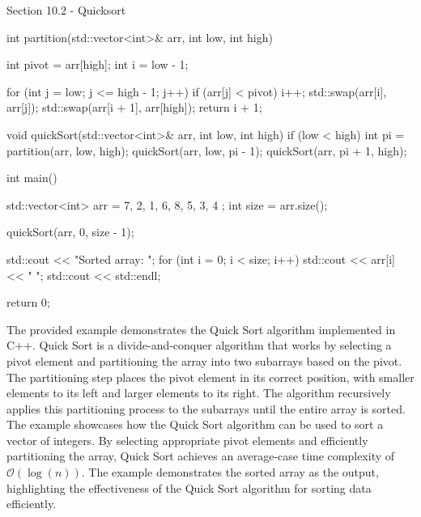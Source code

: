 \begin{notes}{Section 10.2 - Quicksort}
\begin{highlight}
\begin{code}[C++]
    int partition(std::vector<int>& arr, int low, int high) {
        int pivot = arr[high];
        int i = low - 1;
    
        for (int j = low; j <= high - 1; j++) {
            if (arr[j] < pivot) {
                i++;
                std::swap(arr[i], arr[j]);
            }
        }
        std::swap(arr[i + 1], arr[high]);
        return i + 1;
    }
    
    void quickSort(std::vector<int>& arr, int low, int high) {
        if (low < high) {
            int pi = partition(arr, low, high);
            quickSort(arr, low, pi - 1);
            quickSort(arr, pi + 1, high);
        }
    }
    
    int main() {
        std::vector<int> arr = { 7, 2, 1, 6, 8, 5, 3, 4 };
        int size = arr.size();
    
        quickSort(arr, 0, size - 1);
    
        std::cout << "Sorted array: ";
        for (int i = 0; i < size; i++) {
            std::cout << arr[i] << " ";
        }
        std::cout << std::endl;
    
        return 0;
    }  
    \end{code}
        The provided example demonstrates the Quick Sort algorithm implemented in C++. Quick Sort is a divide-and-conquer algorithm that works by selecting a pivot element and partitioning the array into two subarrays based on the pivot. The partitioning step places the pivot element in its correct position, with smaller elements to its left and 
        larger elements to its right. The algorithm recursively applies this partitioning process to the subarrays until the entire array is sorted. The example showcases how the Quick Sort algorithm can be used to sort a vector of integers. By selecting appropriate pivot elements and efficiently partitioning the array, Quick Sort achieves an 
        average-case time complexity of $\mathcal{O}(\log{(n)})$. The example demonstrates the sorted array as the output, highlighting the effectiveness of the Quick Sort algorithm for sorting data efficiently.
    \end{highlight}
\end{notes}

